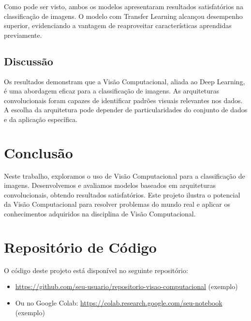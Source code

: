 \documentclass{article}
\begin{document}
                                                            Como pode ser visto, ambos os modelos apresentaram resultados satisfat\'orios na classifica\c{c}\~ao de imagens. O modelo com Transfer Learning alcan\c{c}ou desempenho superior, evidenciando a vantagem de reaproveitar caracter\'isticas aprendidas previamente.

                                                            \subsection{Discuss\~ao}
                                                            Os resultados demonstram que a Vis\~ao Computacional, aliada ao Deep Learning, \'e uma abordagem eficaz para a classifica\c{c}\~ao de imagens. As arquiteturas convolucionais foram capazes de identificar padr\~oes visuais relevantes nos dados. A escolha da arquitetura pode depender de particularidades do conjunto de dados e da aplica\c{c}\~ao espec\'ifica.

                                                            \section{Conclus\~ao}
                                                            Neste trabalho, exploramos o uso de Vis\~ao Computacional para a classifica\c{c}\~ao de imagens. Desenvolvemos e avaliamos modelos baseados em arquiteturas convolucionais, obtendo resultados satisfat\'orios. Este projeto ilustra o potencial da Vis\~ao Computacional para resolver problemas do mundo real e aplicar os conhecimentos adquiridos na disciplina de Vis\~ao Computacional.

                                                            \section{Reposit\'orio de C\'odigo}
                                                            O c\'odigo deste projeto est\'a dispon\'ivel no seguinte reposit\'orio:
                                                            \begin{itemize}
                                                                \item \url{https://github.com/seu-usuario/repositorio-visao-computacional} (exemplo)
                                                                    \item Ou no Google Colab: \url{https://colab.research.google.com/seu-notebook} (exemplo)
                                                                    \end{itemize}
\end{document}
